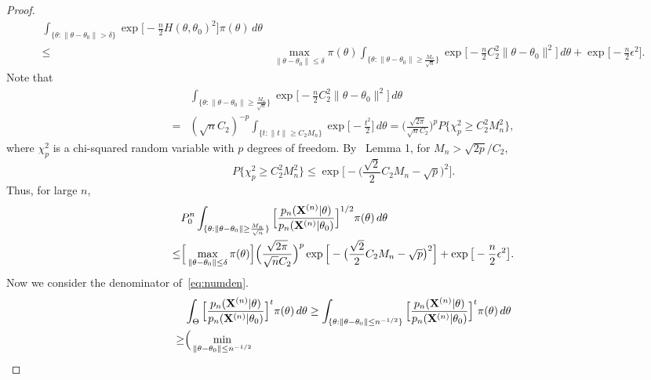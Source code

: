\documentclass[3p]{elsarticle}
\theoremstyle{plain}
\theoremstyle{definition}
\theoremstyle{remark}
\begin{document}
\begin{proof}
$$\begin{aligned}
        \int_{\{\theta: \|\theta-\theta_0\|>\delta\}} \exp \big[ -\frac{n}{2}H(\theta,\theta_0)^2 \big] \pi(\theta) \, d \theta
        \\
        \leq &
        \max_{\|\theta-\theta_0\|\leq \delta}\pi(\theta)
        \int_{\big\{\theta: \|\theta-\theta_0\|\geq \frac{M_n}{\sqrt{n}} \big\}} \exp\big[-\frac{n}{2} C_2^2\|\theta-\theta_0\|^2\big] \, d \theta
        +
        \exp\big[-\frac{n}{2}\epsilon^2\big].
    \end{aligned}
    $$
    Note that
    $$
    \begin{aligned}
        &\int_{\big\{\theta: \|\theta-\theta_0\|\geq \frac{M_n}{\sqrt{n}} \big\}} \exp\big[-\frac{n}{2} C_2^2\|\theta-\theta_0\|^2\big] \, d \theta
\\
        =&
        (\sqrt{n} C_2)^{-p}\int_{\big\{t: \|t\|\geq C_2 M_n \big\}} \exp\big[-\frac{t^2}{2} \big] \, d \theta
        =
        \Big(\frac{\sqrt{2\pi}}{\sqrt{n} C_2}\Big)^{p} P\{\chi^2_p\geq C_2^2 M_n^2\},
    \end{aligned}
    $$
    where $\chi^2_p$ is a chi-squared random variable with $p$ degrees of freedom.
    By~\cite{Laurent2000Adaptive} Lemma 1, for $M_n>\sqrt{2p}/C_2$,
    $$
    P\{\chi^2_p\geq C_2^2 M_n^2\}\leq \exp\Big[-\big(\frac{\sqrt{2}}{2}C_2 M_n-\sqrt{p}\big)^2\Big].
    $$
    Thus, for large $n$,
    \begin{equation}\label{eq:num}
    \begin{aligned}
        &P_0^n\int_{\{\theta:\|\theta-\theta_0\|\geq \frac{M_n}{\sqrt{n}}\} } \Big[ \frac{p_n(\mathbf{X}^{(n)}|\theta)}{p_n(\mathbf{X}^{(n)}|\theta_0)}  \Big]^{1/2} \pi(\theta) \, d \theta
        \\
        \leq&
        \Big[\max_{\|\theta-\theta_0\|\leq \delta} \pi(\theta)\Big]
\Big(\frac{\sqrt{2\pi}}{\sqrt{n} C_2}\Big)^{p}
\exp\Big[-\big(\frac{\sqrt{2}}{2}C_2 M_n-\sqrt{p}\big)^2\Big]
        +
        \exp\big[-\frac{n}{2}\epsilon^2\big]
        .
    \end{aligned}
    \end{equation}
    Now we consider the denominator of~\eqref{eq:numden}.
    $$
    \begin{aligned}
        & \int_{\Theta}\Big[\frac{p_n(\BX^{(n)}|\theta)}{p_n(\BX^{(n)}|\theta_0)}\Big]^{t} \pi(\theta)\, d\theta
        \geq
        \int_{\{\theta:\|\theta-\theta_0\|\leq n^{-1/2}\}}\Big[\frac{p_n(\BX^{(n)}|\theta)}{p_n(\BX^{(n)}|\theta_0)}\Big]^{t} \pi(\theta)\, d\theta
        \\
        \geq &
        \Big(
        \min_{\|\theta-\theta_0\|\leq n^{-1/2}} 

\end{aligned}$$
\end{proof}
\end{document}

